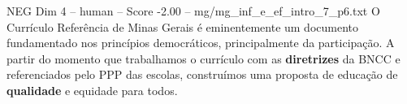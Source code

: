 \begin{textsample}{NEG Dim 4 – human – Score -2.00 – mg/mg\_inf\_e\_ef\_intro\_7\_p6.txt}  \label{ex:f4_neg_005}
O Currículo Referência de Minas Gerais é eminentemente um documento fundamentado nos princípios democráticos, principalmente da participação.
A partir do momento que trabalhamos o currículo com as \textbf{diretrizes} da BNCC e referenciados pelo PPP das escolas, construímos uma proposta de educação de \textbf{qualidade} e equidade para todos.

\end{textsample}
